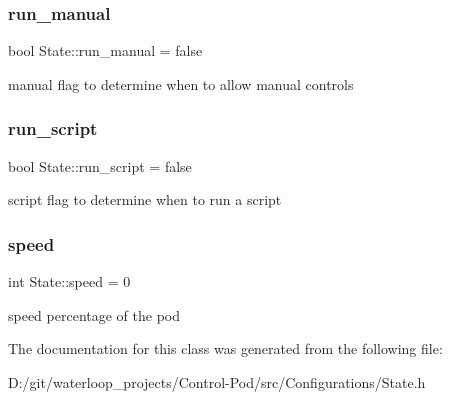 \subsubsection{\texorpdfstring{run\+\_\+manual}{run\_manual}}
{\footnotesize\ttfamily bool State\+::run\+\_\+manual = false}

manual flag to determine when to allow manual controls \mbox{\label{class_state_a9deb72b03f3636b1a269f66d16cbc758}} 
\subsubsection{\texorpdfstring{run\+\_\+script}{run\_script}}
{\footnotesize\ttfamily bool State\+::run\+\_\+script = false}

script flag to determine when to run a script \mbox{\label{class_state_afce303a17e5aa9bc5a1e062ed1b829e4}} 
\subsubsection{\texorpdfstring{speed}{speed}}
{\footnotesize\ttfamily int State\+::speed = 0}

speed percentage of the pod 

The documentation for this class was generated from the following file\+:\begin{DoxyCompactItemize}
\item 
D\+:/git/waterloop\+\_\+projects/\+Control-\/\+Pod/src/\+Configurations/State.\+h\end{DoxyCompactItemize}
